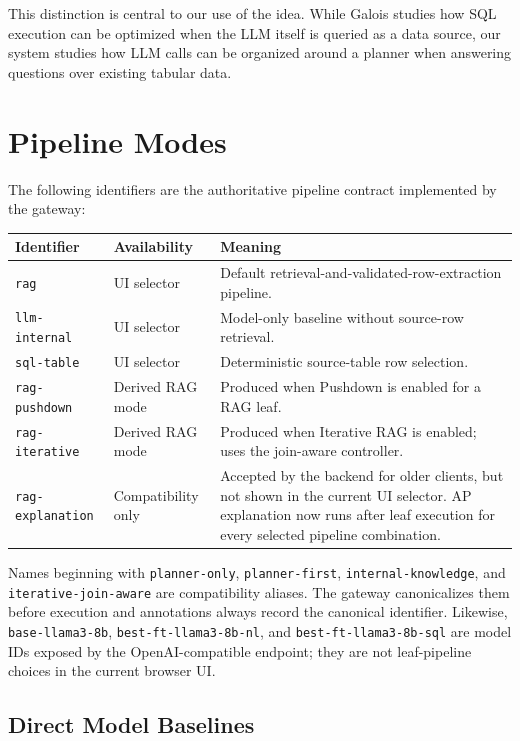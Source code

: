 \documentclass[11pt,a4paper]{article}
\newcommand{\code}[1]{\texttt{#1}}
\begin{document}
This distinction is central to our use of the idea. While Galois studies how SQL execution can be optimized when the LLM itself is queried as a data source, our system studies how LLM calls can be organized around a planner when answering questions over existing tabular data.

\section{Pipeline Modes}

The following identifiers are the authoritative pipeline contract implemented
by the gateway:

\begin{longtable}{>{\raggedright\arraybackslash}p{} >{\raggedright\arraybackslash}p{} >{\raggedright\arraybackslash}p{}}
\toprule
Identifier & Availability & Meaning \\
\midrule
\endhead
\code{rag} & UI selector & Default retrieval-and-validated-row-extraction pipeline. \\
\code{llm-internal} & UI selector & Model-only baseline without source-row retrieval. \\
\code{sql-table} & UI selector & Deterministic source-table row selection. \\
\code{rag-pushdown} & Derived RAG mode & Produced when Pushdown is enabled for a RAG leaf. \\
\code{rag-iterative} & Derived RAG mode & Produced when Iterative RAG is enabled; uses the join-aware controller. \\
\code{rag-explanation} & Compatibility only & Accepted by the backend for older clients, but not shown in the current UI selector. AP explanation now runs after leaf execution for every selected pipeline combination. \\
\bottomrule
\end{longtable}

Names beginning with \code{planner-only}, \code{planner-first},
\code{internal-knowledge}, and \code{iterative-join-aware} are compatibility
aliases. The gateway canonicalizes them before execution and annotations always
record the canonical identifier. Likewise, \code{base-llama3-8b},
\code{best-ft-llama3-8b-nl}, and \code{best-ft-llama3-8b-sql} are model IDs
exposed by the OpenAI-compatible endpoint; they are not leaf-pipeline choices
in the current browser UI.

\subsection{Direct Model Baselines}
\end{document}
